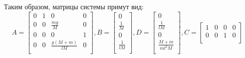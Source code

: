 Таким образом, матрицы системы примут вид: 
\begin{equation}
    A = \begin{bmatrix}
        0 & 1 & 0 & 0 \\
        0 & 0 & \frac{mg}{M} & 0 \\
        0 & 0 & 0 & 1 \\
        0 & 0 & \frac{g(M + m)}{lM} & 0 \\
    \end{bmatrix}, B = \begin{bmatrix}
        0 \\
        \frac{1}{M} \\
        0 \\
        \frac{1}{lM} \\
    \end{bmatrix}, D = \begin{bmatrix}
        0 \\
        \frac{1}{lM} \\
        0 \\
        \frac{M + m}{ml^2M} \\ 
    \end{bmatrix}, C = \begin{bmatrix}
        1 & 0 & 0 & 0 \\
        0 & 0 & 1 & 0 \\ 
    \end{bmatrix}
\end{equation}
